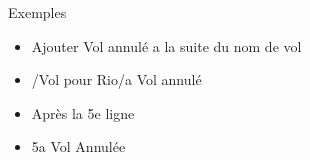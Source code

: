 \begin{frame}[containsverbatim]{\ftitle}
\def\blocktitle{Exemples}
\begin{block}{\blocktitle}
\begin{itemize}
\item Ajouter Vol annulé a la suite du nom de vol
\item /Vol pour Rio/a Vol annulé
\item Après la 5e ligne
\item 5a Vol Annulée 
\end{itemize}
\end{block}
\end{frame}


